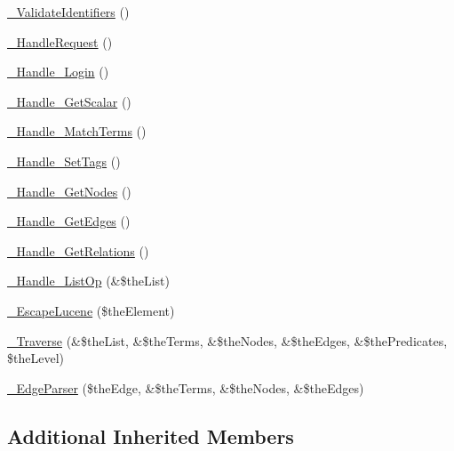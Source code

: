 \begin{DoxyCompactItemize}
\item 
\hyperlink{class_c_warehouse_wrapper_af4e5d5995ca749eaa6f472913a27fae7}{\-\_\-\-Validate\-Identifiers} ()
\item 
\hyperlink{class_c_warehouse_wrapper_a4b909b5b4aba967200ff72e3e6924b5e}{\-\_\-\-Handle\-Request} ()
\item 
\hyperlink{class_c_warehouse_wrapper_a1153f34202b1b0ddc32690c1c04c0bf7}{\-\_\-\-Handle\-\_\-\-Login} ()
\item 
\hyperlink{class_c_warehouse_wrapper_ab32a637787862fbfd3075290a4d18719}{\-\_\-\-Handle\-\_\-\-Get\-Scalar} ()
\item 
\hyperlink{class_c_warehouse_wrapper_aead0b4da91699b383ec12af01bcb2d9d}{\-\_\-\-Handle\-\_\-\-Match\-Terms} ()
\item 
\hyperlink{class_c_warehouse_wrapper_a0db8f3ea3a5eb7acae00766257539292}{\-\_\-\-Handle\-\_\-\-Set\-Tags} ()
\item 
\hyperlink{class_c_warehouse_wrapper_a547daf93a0bac707159ce50b6f429d7b}{\-\_\-\-Handle\-\_\-\-Get\-Nodes} ()
\item 
\hyperlink{class_c_warehouse_wrapper_a3c430fa7beda3d719cf75c21f4e1593d}{\-\_\-\-Handle\-\_\-\-Get\-Edges} ()
\item 
\hyperlink{class_c_warehouse_wrapper_a5dfe94fe77e5af8a69a7361619f858d0}{\-\_\-\-Handle\-\_\-\-Get\-Relations} ()
\item 
\hyperlink{class_c_warehouse_wrapper_a9800cf5ca4bb22cd96a94ef542010adf}{\-\_\-\-Handle\-\_\-\-List\-Op} (\&\$the\-List)
\item 
\hyperlink{class_c_warehouse_wrapper_a6cd98a621a9cfc942cb192e1bd2ab392}{\-\_\-\-Escape\-Lucene} (\$the\-Element)
\item 
\hyperlink{class_c_warehouse_wrapper_a580176717584b10567decd8a88a74eef}{\-\_\-\-Traverse} (\&\$the\-List, \&\$the\-Terms, \&\$the\-Nodes, \&\$the\-Edges, \&\$the\-Predicates, \$the\-Level)
\item 
\hyperlink{class_c_warehouse_wrapper_a07ece9ec1b80bcba3acb40079e0a27d2}{\-\_\-\-Edge\-Parser} (\$the\-Edge, \&\$the\-Terms, \&\$the\-Nodes, \&\$the\-Edges)
\end{DoxyCompactItemize}
\subsection*{Additional Inherited Members}


